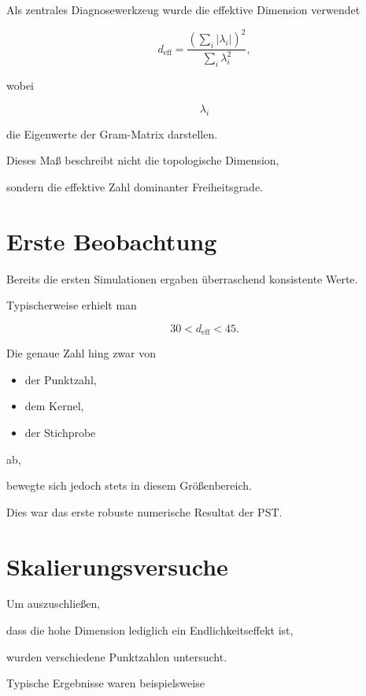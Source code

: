 Als zentrales Diagnosewerkzeug wurde die effektive Dimension verwendet

\[
d_{\mathrm{eff}}
=
\frac{\left(\sum_i |\lambda_i|\right)^2}
{\sum_i \lambda_i^2},
\]

wobei

\[
\lambda_i
\]

die Eigenwerte der Gram-Matrix darstellen.

Dieses Maß beschreibt nicht die topologische Dimension,

sondern die effektive Zahl dominanter Freiheitsgrade.


\section*{Erste Beobachtung}

Bereits die ersten Simulationen ergaben überraschend konsistente Werte.

Typischerweise erhielt man

\[
30
<
d_{\mathrm{eff}}
<
45.
\]

Die genaue Zahl hing zwar von

\begin{itemize}

\item der Punktzahl,

\item dem Kernel,

\item der Stichprobe

\end{itemize}

ab,

bewegte sich jedoch stets in diesem Größenbereich.

Dies war das erste robuste numerische Resultat der PST.


\section*{Skalierungsversuche}

Um auszuschließen,

dass die hohe Dimension lediglich ein Endlichkeitseffekt ist,

wurden verschiedene Punktzahlen untersucht.

Typische Ergebnisse waren beispielsweise

